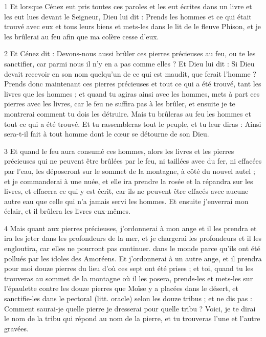 
\par 1 Et lorsque Cénez eut pris toutes ces paroles et les eut écrites dans un livre et les eut lues devant le Seigneur, Dieu lui dit : Prends les hommes et ce qui était trouvé avec eux et tous leurs biens et mets-les dans le lit de le fleuve Phison, et je les brûlerai au feu afin que ma colère cesse d'eux.

\par 2 Et Cénez dit : Devons-nous aussi brûler ces pierres précieuses au feu, ou te les sanctifier, car parmi nous il n'y en a pas comme elles ? Et Dieu lui dit : Si Dieu devait recevoir en son nom quelqu'un de ce qui est maudit, que ferait l'homme ? Prends donc maintenant ces pierres précieuses et tout ce qui a été trouvé, tant les livres que les hommes ; et quand tu agiras ainsi avec les hommes, mets à part ces pierres avec les livres, car le feu ne suffira pas à les brûler, et ensuite je te montrerai comment tu dois les détruire. Mais tu brûleras au feu les hommes et tout ce qui a été trouvé. Et tu rassembleras tout le peuple, et tu leur diras : Ainsi sera-t-il fait à tout homme dont le cœur se détourne de son Dieu.

\par 3 Et quand le feu aura consumé ces hommes, alors les livres et les pierres précieuses qui ne peuvent être brûlées par le feu, ni taillées avec du fer, ni effacées par l'eau, les déposeront sur le sommet de la montagne, à côté du nouvel autel ; et je commanderai à une nuée, et elle ira prendre la rosée et la répandra sur les livres, et effacera ce qui y est écrit, car ils ne peuvent être effacés avec aucune autre eau que celle qui n'a jamais servi les hommes. Et ensuite j'enverrai mon éclair, et il brûlera les livres eux-mêmes.

\par 4 Mais quant aux pierres précieuses, j'ordonnerai à mon ange et il les prendra et ira les jeter dans les profondeurs de la mer, et je chargerai les profondeurs et il les engloutira, car elles ne pourront pas continuer. dans le monde parce qu'ils ont été pollués par les idoles des Amoréens. Et j'ordonnerai à un autre ange, et il prendra pour moi douze pierres du lieu d'où ces sept ont été prises ; et toi, quand tu les trouveras au sommet de la montagne où il les posera, prends-les et mets-les sur l'épaulette contre les douze pierres que Moïse y a placées dans le désert, et sanctifie-les dans le pectoral (litt. oracle) selon les douze tribus ; et ne dis pas : Comment saurai-je quelle pierre je dresserai pour quelle tribu ? Voici, je te dirai le nom de la tribu qui répond au nom de la pierre, et tu trouveras l'une et l'autre gravées.

